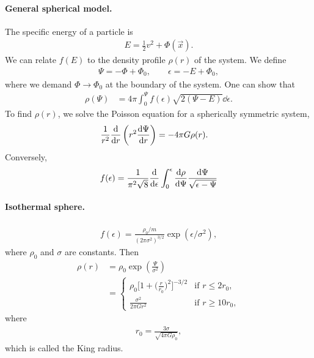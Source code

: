 \paragraph*{General spherical model.}
The specific energy of a particle is
\begin{align*}
	E = \frac{1}{2} v^2 + \Phi(\vec{x}).
\end{align*}
We can relate $f(E)$ to the density profile $\rho(r)$ of the system. We define
\begin{align*}
	\Psi = - \Phi + \Phi_0, \qquad
	\epsilon = - E + \Phi_0,
\end{align*}
where we demand $\Phi \to \Phi_0$ at the boundary of the system. One can show that
\begin{align*}
	\rho(\Psi)
	&= 4 \pi \int_0^\Psi f(\epsilon) \sqrt{2(\Psi - E)} \dd{\epsilon}.
\end{align*}
To find $\rho(r)$, we solve the Poisson equation for a spherically symmetric system,
\begin{align*}
	\frac{1}{r^2} \dv{}{r} \left( r^2 \dv{\Psi}{r} \right)
	&= - 4 \pi G \rho(r).
\end{align*}
Conversely,
\begin{align*}
	f(\epsilon)
	= \frac{1}{\pi^2 \sqrt{8}}
	\dv{}{\epsilon}
	\int_0^\epsilon \dv{\rho}{\Psi} \frac{\dd{\Psi}}{\sqrt{\epsilon-\Psi}}
\end{align*}

\paragraph*{Isothermal sphere.}
\begin{align*}
	f(\epsilon)
	= \frac{\rho_0/m}{(2\pi\sigma^2)^{3/2}} \exp(\epsilon/\sigma^2),
\end{align*}
where $\rho_0$ and $\sigma$ are constants. Then
\begin{align*}
	\rho(r) 
	&= \rho_0 \exp\left( \frac{\Psi}{\sigma^2} \right)\\
	&=
	\begin{cases}
		\rho_0   \Big[ 1 + \Big( \frac{r}{r_0} \Big)^2 \Big]^{-3/2}
		& \text{if } r \leq 2 r_0,\\
		\frac{\sigma^2}{2\pi G r^2}
		& \text{if } r \geq 10 r_0,
	\end{cases}
\end{align*}
where
\begin{align*}
	r_0 = \frac{3\sigma}{\sqrt{4\pi G \rho_0}},
\end{align*}
which is called the King radius.

